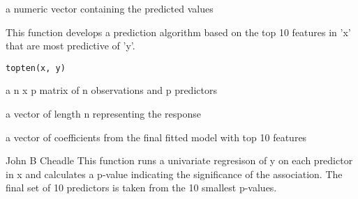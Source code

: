 \documentclass[a4paper]{book}
\begin{document}
%
\begin{Value}
a numeric vector containing the predicted values
\end{Value}
%
\begin{Description}\relax
This function develops a prediction algorithm based on the top 10 features
in 'x' that are most predictive of 'y'.
\end{Description}
%
\begin{Usage}
\begin{verbatim}
topten(x, y)
\end{verbatim}
\end{Usage}
%
\begin{Arguments}
\begin{ldescription}
\item[\code{x}] a n x p matrix of n observations and p predictors

\item[\code{y}] a vector of length n representing the response
\end{ldescription}
\end{Arguments}
%
\begin{Value}
a vector of coefficients from the final fitted model with top 10 features
\end{Value}
%
\begin{Author}\relax
John B Cheadle
This function runs a univariate regresison of y on each predictor in x
and calculates a p-value indicating the significance of the association.
The final set of 10 predictors is taken from the 10 smallest p-values.
\end{Author}
%
\begin{SeeAlso}\relax
{}
\end{SeeAlso}
\printindex{}
\end{document}
